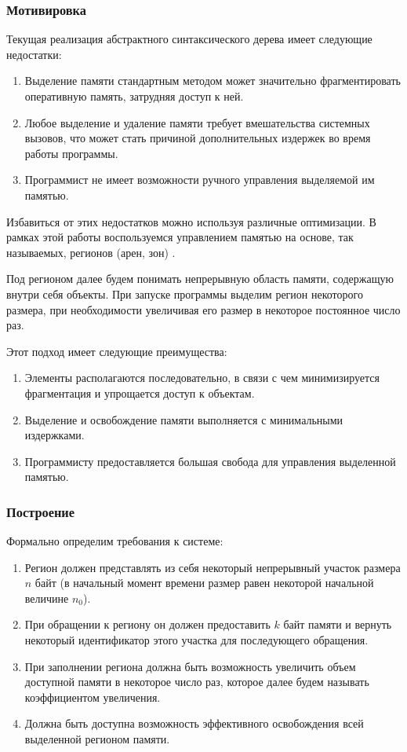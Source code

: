 \subsubsection{Мотивировка}
Текущая реализация абстрактного синтаксического дерева имеет следующие
недостатки:
\begin{enumerate}
    \item Выделение памяти стандартным методом может значительно
    фрагментировать оперативную память, затрудняя доступ к ней.
    \item Любое выделение и удаление памяти требует вмешательства системных
    вызовов, что может стать причиной дополнительных издержек во время
    работы программы.
    \item Программист не имеет возможности ручного управления выделяемой им
    памятью.
\end{enumerate}

Избавиться от этих недостатков можно используя различные оптимизации. В рамках
этой работы воспользуемся управлением памятью на основе, так называемых,
регионов (арен, зон) \cite{wangmemory}.

Под регионом далее будем понимать непрерывную область памяти, содержащую внутри
себя объекты. При запуске программы выделим регион некоторого размера, при
необходимости увеличивая его размер в некоторое постоянное число раз.

Этот подход имеет следующие преимущества:
\begin{enumerate}
    \item Элементы располагаются последовательно, в связи с чем минимизируется
    фрагментация и упрощается доступ к объектам.
    \item Выделение и освобождение памяти выполняется с минимальными
    издержками.
    \item Программисту предоставляется большая свобода для управления
    выделенной памятью.
\end{enumerate}

\subsubsection{Построение}
Формально определим требования к системе:
\begin{enumerate}
    \item Регион должен представлять из себя некоторый непрерывный участок
    размера $n$ байт (в начальный момент времени размер равен некоторой
    начальной величине $n_0$).
    \item При обращении к региону он должен предоставить $k$ байт памяти и
    вернуть некоторый идентификатор этого участка для последующего обращения.
    \item При заполнении региона должна быть возможность увеличить объем
    доступной памяти в некоторое число раз, которое далее будем называть
    коэффициентом увеличения.
    \item Должна быть доступна возможность эффективного освобождения всей
    выделенной регионом памяти.
\end{enumerate}


